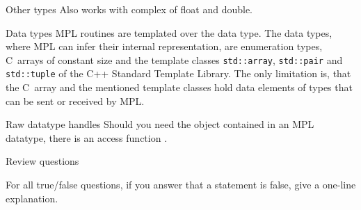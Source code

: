 \begin{mplnote}{Other types}
  Also works with complex of float and double.
\end{mplnote}

\begin{mplnote}{Data types}
  MPL routines are templated over the data type.  The data types,
  where MPL can infer their internal representation, are enumeration
  types, C~arrays of constant size and the template classes
  \lstinline+std::array+,
  \lstinline+std::pair+ and
  \lstinline+std::tuple+
  of the C++ Standard Template
  Library. The only limitation is, that the C~array and the mentioned
  template classes hold data elements of types that can be sent or
  received by MPL.
\end{mplnote}

\begin{mplnote}{Raw datatype handles}
  Should you need the  object
  contained in an MPL datatype,
  there is an access function .
\end{mplnote}










\newpage
{} {Review questions}

For all true/false questions, if you answer that a statement is false,
give a one-line explanation.

